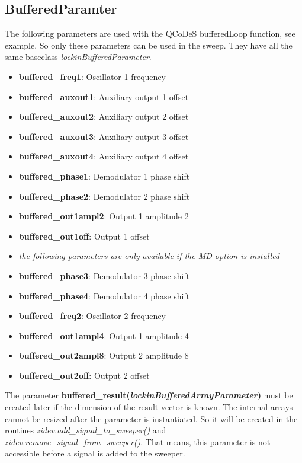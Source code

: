 \documentclass[11pt]{article} %
\begin{document}
\subsection{BufferedParamter}

The following parameters are used with the QCoDeS bufferedLoop function, see example. So only these parameters can be used in the sweep. They have all the same baseclass {\it lockinBufferedParameter}.
\begin{itemize}
\itemsep0pt
\item {\bf buffered\_freq1}: Oscillator 1 frequency
\item {\bf buffered\_auxout1}: Auxiliary output 1 offset
\item {\bf buffered\_auxout2}: Auxiliary output 2 offset
\item {\bf buffered\_auxout3}: Auxiliary output 3 offset
\item {\bf buffered\_auxout4}: Auxiliary output 4 offset
\item {\bf buffered\_phase1}: Demodulator 1 phase shift
\item {\bf buffered\_phase2}: Demodulator 2 phase shift
\item {\bf buffered\_out1ampl2}: Output 1 amplitude 2
\item {\bf buffered\_out1off}: Output 1 offset
\item[] {\it the following parameters are only available if the MD option is installed}
\item {\bf buffered\_phase3}: Demodulator 3 phase shift
\item {\bf buffered\_phase4}: Demodulator 4 phase shift
\item {\bf buffered\_freq2}: Oscillator 2 frequency
\item {\bf buffered\_out1ampl4}: Output 1 amplitude 4
\item {\bf buffered\_out2ampl8}: Output 2 amplitude 8
\item {\bf buffered\_out2off}: Output 2 offset
\end{itemize}

The parameter {\bf buffered\_result({\it lockinBufferedArrayParameter})} must be created later if the dimension of the result vector is known. The internal arrays cannot be resized after the parameter is instantiated. So it will be created in the routines {\it zidev.add\_signal\_to\_sweeper()} and {\it zidev.remove\_signal\_from\_sweeper()}. That means, this parameter is not accessible before a signal is added to the sweeper.
\end{document}
